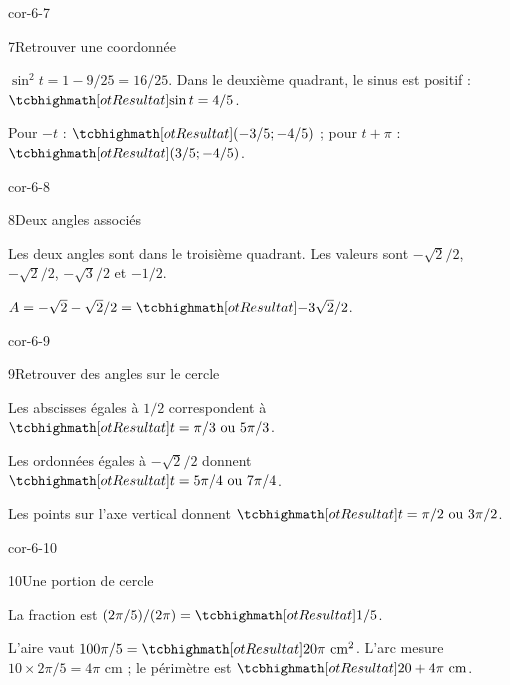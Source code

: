\begin{blocLivre}{cor-6-7}
\begin{corrige}{7}{Retrouver une coordonnée}
\begin{questions}
\item $\sin^2t=1-9/25=16/25$. Dans le deuxième quadrant, le sinus est positif : $\res{\sin t=4/5}$.
\item Pour $-t$ : $\res{(-3/5;-4/5)}$ ; pour $t+\pi$ : $\res{(3/5;-4/5)}$.
\end{questions}
\label{figlivre-r06-07-coordonnee-cor}

\end{corrige}
\end{blocLivre}
\begin{blocLivre}{cor-6-8}
\begin{corrige}{8}{Deux angles associés}
\begin{questions}
\item Les deux angles sont dans le troisième quadrant. Les valeurs sont $-\sqrt2/2$, $-\sqrt2/2$, $-\sqrt3/2$ et $-1/2$.
\item $A=-\sqrt2-\sqrt2/2=\res{-3\sqrt2/2}$.
\end{questions}
\end{corrige}
\end{blocLivre}
\begin{blocLivre}{cor-6-9}
\begin{corrige}{9}{Retrouver des angles sur le cercle}
\begin{questions}
\item Les abscisses égales à $1/2$ correspondent à $\res{t=\pi/3\text{ ou }5\pi/3}$.
\item Les ordonnées égales à $-\sqrt2/2$ donnent $\res{t=5\pi/4\text{ ou }7\pi/4}$.
\item Les points sur l’axe vertical donnent $\res{t=\pi/2\text{ ou }3\pi/2}$.
\end{questions}

\label{figgeo-06-09-cor}
\end{corrige}
\end{blocLivre}
\begin{blocLivre}{cor-6-10}
\begin{corrige}{10}{Une portion de cercle}
\begin{questions}
\item La fraction est $(2\pi/5)/(2\pi)=\res{1/5}$.
\item L’aire vaut $100\pi/5=\res{20\pi\text{ cm}^2}$. L’arc mesure $10\times2\pi/5=4\pi$ cm ; le périmètre est $\res{20+4\pi\text{ cm}}$.
\end{questions}

\label{figgeo-06-10-cor}
\end{corrige}
\end{blocLivre}
